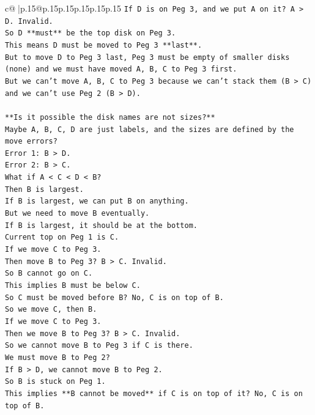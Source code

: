 \documentclass{article}
\begin{document}
{\begin{supertabular}{c@{$\;$}|p{.15\linewidth}@{}p{.15\linewidth}p{.15\linewidth}p{.15\linewidth}p{.15\linewidth}p{.15\linewidth}}
{{{\texttt{If D is on Peg 3, and we put A on it? A > D. Invalid.} \\
\texttt{So D **must** be the top disk on Peg 3.} \\
\texttt{This means D must be moved to Peg 3 **last**.} \\
\texttt{But to move D to Peg 3 last, Peg 3 must be empty of smaller disks (none) and we must have moved A, B, C to Peg 3 first.} \\
\texttt{But we can't move A, B, C to Peg 3 because we can't stack them (B > C) and we can't use Peg 2 (B > D).} \\
\\ 
\texttt{**Is it possible the disk names are not sizes?**} \\
\texttt{Maybe A, B, C, D are just labels, and the sizes are defined by the move errors?} \\
\texttt{Error 1: B > D.} \\
\texttt{Error 2: B > C.} \\
\texttt{What if A < C < D < B?} \\
\texttt{Then B is largest.} \\
\texttt{If B is largest, we can put B on anything.} \\
\texttt{But we need to move B eventually.} \\
\texttt{If B is largest, it should be at the bottom.} \\
\texttt{Current top on Peg 1 is C.} \\
\texttt{If we move C to Peg 3.} \\
\texttt{Then move B to Peg 3? B > C. Invalid.} \\
\texttt{So B cannot go on C.} \\
\texttt{This implies B must be below C.} \\
\texttt{So C must be moved before B? No, C is on top of B.} \\
\texttt{So we move C, then B.} \\
\texttt{If we move C to Peg 3.} \\
\texttt{Then we move B to Peg 3? B > C. Invalid.} \\
\texttt{So we cannot move B to Peg 3 if C is there.} \\
\texttt{We must move B to Peg 2?} \\
\texttt{If B > D, we cannot move B to Peg 2.} \\
\texttt{So B is stuck on Peg 1.} \\
\texttt{This implies **B cannot be moved** if C is on top of it? No, C is on top of B.} \\
}}}
\end{supertabular}}
\end{document}

